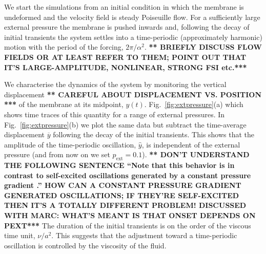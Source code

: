 \documentclass[aps,prl,reprint,superscriptaddress,floatfix]{revtex4-1}
\begin{document}

We start the simulations from an initial condition in
which the membrane is undeformed and the velocity
field is steady Poiseuille flow. For a sufficiently large external
pressure the membrane is pushed inwards and, following 
the decay of initial transients the system settles into a
time-periodic (approximately harmonic) motion with the period of the
forcing, $2\pi/\alpha^2$. {\bf *** BRIEFLY DISCUSS FLOW FIELDS OR
  AT LEAST REFER TO THEM; POINT OUT THAT IT'S LARGE-AMPLITUDE,
  NONLINEAR, STRONG FSI etc.***}

We characterise the dynamics of the system by monitoring the vertical
displacement {\bf *** CAREFUL ABOUT DISPLACEMENT VS. POSITION ***}
of the membrane at its midpoint, $y(t)$.
Fig.~\ref{fig:extpressure}(a) which shows time traces of this quantity
for a range of external pressures. In Fig.~\ref{fig:extpressure}(b) we plot
the same data but subtract the time-average displacement
$\overline{y}$ following the decay of the initial transients. This shows
that the amplitude of the time-periodic oscillation, $\widehat{y}$,
is independent of the external pressure (and from now on we set
$p_\text{ext}=0.1$).
{\bf *** DON'T UNDERSTAND THE FOLLOWING SENTENCE ``Note that this
behavior is in contrast to self-excited oscillations generated by a
constant pressure gradient \cite{Tang15}.'' HOW CAN A CONSTANT
PRESSURE
GRADIENT GENERATED OSCILLATIONS; IF THEY'RE SELF-EXCITED THEN IT'S
A TOTALLY DIFFERENT PROBLEM! DISCUSSED WITH MARC: WHAT'S MEANT IS THAT
ONSET DEPENDS ON PEXT***}
The duration of the initial transients is on the order of the
viscous time unit, $\nu/a^2$. This suggests
that the adjustment toward a time-periodic oscillation is 
controlled by the viscosity of the fluid.
\end{document}
